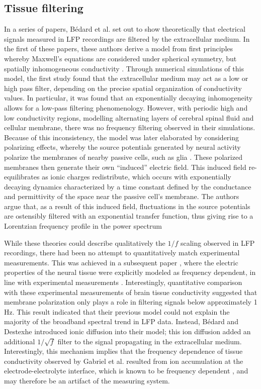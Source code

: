 \subsection{Tissue filtering}
In a series of papers, Bédard et al. set out to show theoretically that electrical signals measured in LFP recordings are filtered by the extracellular medium. In the first of these papers, these authors derive a model from first principles whereby Maxwell’s equations are considered under spherical symmetry, but spatially inhomogeneous conductivity \cite{Bedard2004}. Through numerical simulations of this model, the first study found that the extracellular medium may act as a low or high pass filter, depending on the precise spatial organization of conductivity values. In particular, it was found that an exponentially decaying inhomogeneity allows for a low-pass filtering phenomenology. However, with periodic high and low conductivity regions, modelling alternating layers of cerebral spinal fluid and cellular membrane, there was no frequency filtering observed in their simulations. Because of this inconsistency, the model was later elaborated by considering polarizing effects, whereby the source potentials generated by neural activity polarize the membranes of nearby passive cells, such as glia \cite{Bedard2006a}. These polarized membranes then generate their own “induced” electric field. This induced field re-equilibrates as ionic charges redistribute, which occurs with exponentially decaying dynamics characterized by a time constant defined by the conductance and permittivity of the space near the passive cell’s membrane. The authors argue that, as a result of this induced field, fluctuations in the source potentials are ostensibly filtered with an exponential transfer function, thus giving rise to a Lorentzian frequency profile in the power spectrum

While these theories could describe qualitatively the $1/f$ scaling observed in LFP recordings, there had been no attempt to quantitatively match experimental measurements. This was achieved in a subsequent paper \cite{Bedard2009}, where the electric properties of the neural tissue were explicitly modeled as frequency dependent, in line with experimental measurements \cite{Gabriel1996}. Interestingly, quantitative comparison with these experimental measurements of brain tissue conductivity suggested that membrane polarization only plays a role in filtering signals below approximately 1 Hz. This result indicated that their previous model \cite{Bedard2006a} could not explain the majority of the broadband spectral trend in LFP data. Instead, Bédard and Destexhe\cite{Bedard2006a} introduced ionic diffusion into their model; this ion diffusion added an additional $1/\sqrt{f}$ filter to the signal propagating in the extracellular medium. Interestingly, this mechanism implies that the frequency dependence of tissue conductivity observed by Gabriel et al.\cite{Gabriel1996} resulted from ion accumulation at the electrode-electrolyte interface, which is known to be frequency dependent \cite{Warburg1899}, and may therefore be an artifact of the measuring system.

